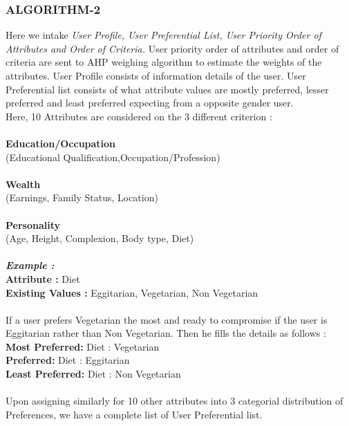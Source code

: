 \documentclass[12pt,oneside]{book}
\begin{document}
\subsubsection{ALGORITHM-\textbf{2}}
Here we intake \textit{User Profile, User Preferential List, User Priority Order of Attributes and Order of Criteria.} User priority order of attributes and order of criteria are sent to AHP weighing algorithm to estimate the weights of the attributes. User Profile consists of information details of the user. User Preferential list consists of what attribute values are mostly preferred, lesser preferred and least preferred expecting from a opposite gender user. \\
Here, 10 Attributes are considered on the 3 different criterion :\\\\
\textbf{Education/Occupation}\\			                         (Educational Qualification,Occupation/Profession)\\\\
\textbf{Wealth}\\	                                                       (Earnings, Family Status, Location)\\\\
\textbf{Personality}\\                                                         (Age, Height, Complexion, Body type, Diet)\\\\
\textbf{\textit{Example :}}\\
\textbf{Attribute :} Diet	\\
\textbf{Existing Values :} Eggitarian, Vegetarian, Non Vegetarian\\\\
If a user prefers Vegetarian the most and ready to compromise if the user is  Eggitarian rather than Non Vegetarian. Then he fills the details as follows :\\
\textbf{Most Preferred:}
Diet : Vegetarian\\
\textbf{Preferred:} 
Diet : Eggitarian\\
\textbf{Least Preferred:}
Diet : Non Vegetarian\\\\
Upon assigning similarly for 10 other attributes into 3 categorial distribution of Preferences, we have a complete list of  User Preferential list.\\\\
\end{document}
